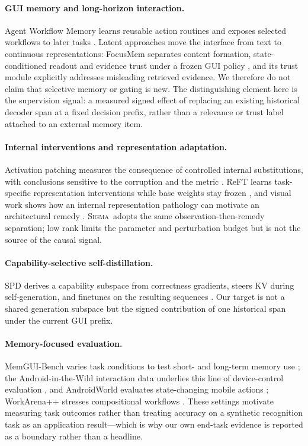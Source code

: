 \documentclass{article}
\newcommand{\method}{\textsc{Sigma}}
\begin{document}
\paragraph{GUI memory and long-horizon interaction.} Agent Workflow Memory learns
reusable action routines and exposes selected workflows to later tasks
\citep{wang2024awm}. Latent approaches move the interface from text to continuous
representations: FocusMem separates content formation, state-conditioned readout
and evidence trust under a frozen GUI policy \citep{zhang2026focusmem}, and its
trust module explicitly addresses misleading retrieved evidence. We therefore do
not claim that selective memory or gating is new. The distinguishing element here
is the supervision signal: a measured signed effect of replacing an existing
historical decoder span at a fixed decision prefix, rather than a relevance or
trust label attached to an external memory item.

\paragraph{Internal interventions and representation adaptation.} Activation
patching measures the consequence of controlled internal substitutions, with
conclusions sensitive to the corruption and the metric
\citep{zhang2024patching}. ReFT learns task-specific representation
interventions while base weights stay frozen \citep{wu2024reft}, and visual
work shows how an internal representation pathology can motivate an
architectural remedy \citep{darcet2024registers}. \method\ adopts the same
observation-then-remedy separation; low rank limits the parameter and
perturbation budget but is not the source of the causal signal.

\paragraph{Capability-selective self-distillation.} SPD derives a capability
subspace from correctness gradients, steers KV during self-generation, and
finetunes on the resulting sequences \citep{hao2026spd}. Our target is not a
shared generation subspace but the signed contribution of one historical span
under the current GUI prefix.

\paragraph{Memory-focused evaluation.} MemGUI-Bench varies task conditions to
test short- and long-term memory use \citep{liu2026memgui}; the Android-in-the-Wild
interaction data underlies this line of device-control evaluation
\citep{rawles2023aitw}, and AndroidWorld evaluates state-changing mobile actions
\citep{rawles2024androidworld}; WorkArena++ stresses compositional workflows
\citep{boisvert2024workarena}.
These settings motivate measuring task outcomes rather than treating accuracy on
a synthetic recognition task as an application result---which is why our own
end-task evidence is reported as a boundary rather than a headline.
\end{document}

